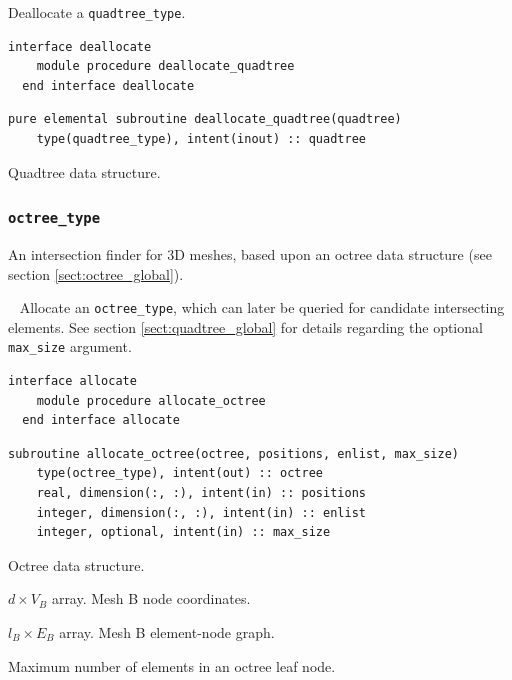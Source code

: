 \documentclass{article}
\begin{document}
\noindent Deallocate a \verb+quadtree_type+.
  
\begin{lstlisting}[language=FORTRAN]
  interface deallocate
    module procedure deallocate_quadtree
  end interface deallocate
\end{lstlisting}
  
\begin{lstlisting}[language=FORTRAN]
  pure elemental subroutine deallocate_quadtree(quadtree)
    type(quadtree_type), intent(inout) :: quadtree
\end{lstlisting}

\begin{description}[font=\ttfamily\bfseries,leftmargin=2.2\parindent,labelindent=1.7\parindent,noitemsep]
  \item[quadtree] Quadtree data structure.
\end{description}

\subsubsection{\texttt{octree\_type}}\label{sect:octree_query}
  
An intersection finder for 3D meshes, based upon an octree data structure (see
section \ref{sect:octree_global}).

~\newline
Allocate an \verb+octree_type+, which can later be queried for candidate
intersecting elements. See section \ref{sect:quadtree_global} for details
regarding the optional \verb+max_size+ argument.

\begin{lstlisting}[language=FORTRAN]
  interface allocate
    module procedure allocate_octree
  end interface allocate
\end{lstlisting}
  
\begin{lstlisting}[language=FORTRAN]
  subroutine allocate_octree(octree, positions, enlist, max_size)
    type(octree_type), intent(out) :: octree
    real, dimension(:, :), intent(in) :: positions
    integer, dimension(:, :), intent(in) :: enlist
    integer, optional, intent(in) :: max_size 
\end{lstlisting}

\begin{description}[font=\ttfamily\bfseries,leftmargin=2.2\parindent,labelindent=1.7\parindent,noitemsep]
  \item[octree] Octree data structure.
  \item[positions] $d \times V_B$ array. Mesh B node coordinates.
  \item[enlist] $l_B \times E_B$ array. Mesh B element-node graph.
  \item[max\_size] Maximum number of elements in an octree leaf node.
\end{description}
\end{document}
